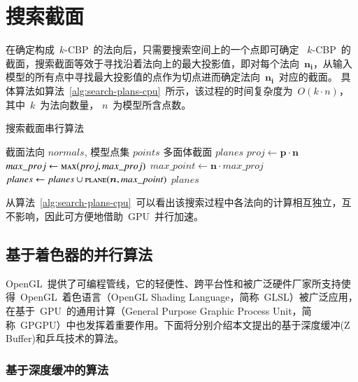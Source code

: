 \section{搜索截面}
\label{sec:search:planes}

在确定构成~$k$-CBP~的法向后，只需要搜索空间上的一个点即可确定
~$k$-CBP~的截面，搜索截面等效于寻找沿着法向上的最大投影值，即对每个法向~$\bm{n_i}$，从输入模型的所有点中寻找最大投影值的点作为切点进而确定法向~$\bm{n_i}$~对应的截面。
具体算法如算法~\ref{alg:search-plans-cpu}~所示，该过程的时间复杂度为~$O(k\cdot
n)$， 其中~$k$~为法向数量， $n$~为模型所含点数。

\begin{algorithm}[htbp]
\small
\caption{搜索截面串行算法}
\label{alg:search-plans-cpu}
\begin{algorithmic}[1]
\Require
截面法向 $normals$, 模型点集 $points$
\Ensure
多面体截面 $planes$
          \State $proj \gets  \bm{p} \cdot \bm{n}$ 
          \State $max\_proj \gets \Call{max}{proj, max\_proj}$ 
      \EndFor
  \EndFor
      \State $max\_point \gets \bm{n} \cdot max\_proj$ 
      \State $planes\gets planes \cup \Call{plane}{\bm{n}, max\_point}$ 
  \EndFor
  \State \Return $planes$
\EndFunction
\end{algorithmic}
\end{algorithm}

从算法~\ref{alg:search-plans-cpu}~可以看出该搜索过程中各法向的计算相互独立，互不影响，因此可方便地借助~GPU~并行加速。


\subsection{基于着色器的并行算法}
\label{subsec:determ-normals-by-shader}

OpenGL~提供了可编程管线，它的轻便性、跨平台性和被广泛硬件厂家所支持使得~OpenGL~着色语言（OpenGL Shading Language，简称~GLSL）被广泛应用，在基于~GPU~的通用计算（General
Purpose Graphic Process Unit，简称~GPGPU）中也发挥着重要作用。下面将分别介绍本文提出的基于深度缓冲(Z Buffer)和乒乓技术的算法。

\subsubsection{基于深度缓冲的算法}
	

